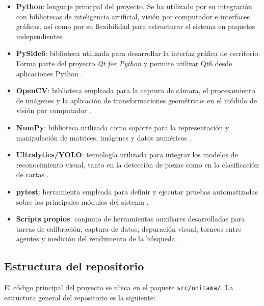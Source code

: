 \begin{itemize}
    \item \textbf{Python}: lenguaje principal del proyecto. Se ha utilizado por su integración con bibliotecas de inteligencia artificial, visión por computador e interfaces gráficas, así como por su flexibilidad para estructurar el sistema en paquetes independientes.

    \item \textbf{PySide6}: biblioteca utilizada para desarrollar la interfaz gráfica de escritorio. Forma parte del proyecto \textit{Qt for Python} y permite utilizar Qt6 desde aplicaciones Python \cite{pyside6_docs}.

    \item \textbf{OpenCV}: biblioteca empleada para la captura de cámara, el procesamiento de imágenes y la aplicación de transformaciones geométricas en el módulo de visión por computador \cite{opencv_docs}.

    \item \textbf{NumPy}: biblioteca utilizada como soporte para la representación y manipulación de matrices, imágenes y datos numéricos \cite{numpy_docs}.

    \item \textbf{Ultralytics/YOLO}: tecnología utilizada para integrar los modelos de reconocimiento visual, tanto en la detección de piezas como en la clasificación de cartas \cite{ultralytics_docs}.

    \item \textbf{pytest}: herramienta empleada para definir y ejecutar pruebas automatizadas sobre los principales módulos del sistema \cite{pytest_docs}.

    \item \textbf{Scripts propios}: conjunto de herramientas auxiliares desarrolladas para tareas de calibración, captura de datos, depuración visual, torneos entre agentes y medición del rendimiento de la búsqueda.
\end{itemize}

\subsection{Estructura del repositorio}

El código principal del proyecto se ubica en el paquete \texttt{src/onitama/}. La estructura general del repositorio es la siguiente:

